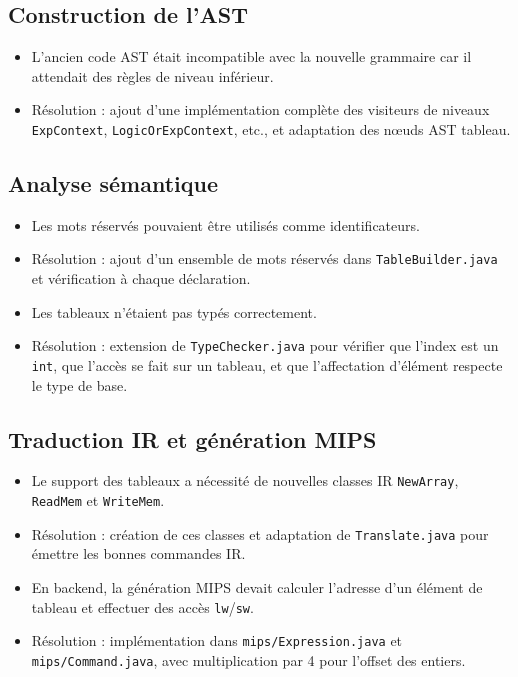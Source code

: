 \documentclass[a4paper,11pt]{article}
\begin{document}
\subsection{Construction de l'AST}
\begin{itemize}
  \item L'ancien code AST était incompatible avec la nouvelle grammaire car il attendait des règles de niveau inférieur.
  \item Résolution : ajout d'une implémentation complète des visiteurs de niveaux \texttt{ExpContext}, \texttt{LogicOrExpContext}, etc., et adaptation des nœuds AST tableau.
\end{itemize}

\subsection{Analyse sémantique}
\begin{itemize}
  \item Les mots réservés pouvaient être utilisés comme identificateurs.
  \item Résolution : ajout d'un ensemble de mots réservés dans \texttt{TableBuilder.java} et vérification à chaque déclaration.
  \item Les tableaux n'étaient pas typés correctement.
  \item Résolution : extension de \texttt{TypeChecker.java} pour vérifier que l'index est un \texttt{int}, que l'accès se fait sur un tableau, et que l'affectation d'élément respecte le type de base.
\end{itemize}

\subsection{Traduction IR et génération MIPS}
\begin{itemize}
  \item Le support des tableaux a nécessité de nouvelles classes IR \texttt{NewArray}, \texttt{ReadMem} et \texttt{WriteMem}.
  \item Résolution : création de ces classes et adaptation de \texttt{Translate.java} pour émettre les bonnes commandes IR.
  \item En backend, la génération MIPS devait calculer l'adresse d'un élément de tableau et effectuer des accès \texttt{lw}/\texttt{sw}.
  \item Résolution : implémentation dans \texttt{mips/Expression.java} et \texttt{mips/Command.java}, avec multiplication par 4 pour l'offset des entiers.
\end{itemize}
\end{document}
